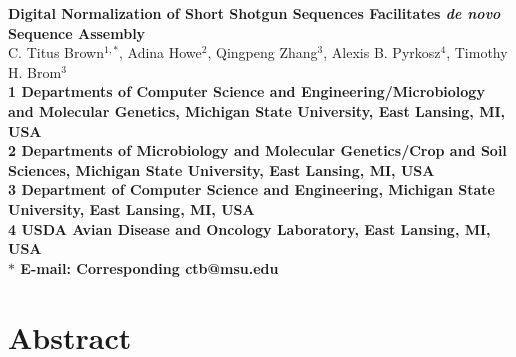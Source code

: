 \documentclass[10pt,draft]{article}
\date{}
\begin{document}
\begin{flushleft}
{\Large
\textbf{Digital Normalization of Short Shotgun Sequences Facilitates
{\em de novo} Sequence Assembly}
}
\\
C. Titus Brown$^{1,\ast}$, 
Adina Howe$^{2}$,
Qingpeng Zhang$^{3}$,
Alexis B. Pyrkosz$^{4}$,
Timothy H. Brom$^{3}$
\\
\bf{1} Departments of Computer Science and Engineering/Microbiology and Molecular Genetics, Michigan State University, East Lansing, MI, USA
\\
\bf{2} Departments of Microbiology and Molecular Genetics/Crop and Soil Sciences, Michigan State University, East Lansing, MI, USA
\\
\bf{3} Department of Computer Science and Engineering, Michigan State University, East Lansing, MI, USA
\\
{\bf{4} USDA Avian Disease and Oncology Laboratory, East Lansing, MI, USA}
\\
$\ast$ E-mail: Corresponding ctb@msu.edu
\end{flushleft}

\section*{Abstract}
\end{document}
